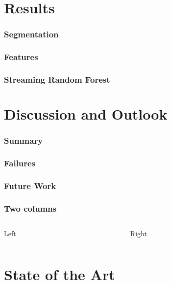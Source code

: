 \documentclass[mathserif]{beamer}
\begin{document}
\section{Results}
\begin{frame}
\frametitle{Segmentation}

\end{frame}

\begin{frame}
\frametitle{Features}

\end{frame}

\begin{frame}
\frametitle{Streaming Random Forest}

\end{frame}


\section{Discussion and Outlook}
\begin{frame}
\frametitle{Summary}

\end{frame}

\begin{frame}
\frametitle{Failures}

\end{frame}

\begin{frame}
\frametitle{Future Work}

\end{frame}



\begin{frame}
\frametitle{Two columns}
\begin{columns}[t]
\begin{column}{0.45\linewidth}
Left
\end{column}
\begin{column}{0.45\linewidth}
Right
\end{column}
\end{columns}
\end{frame}


\section{State of the Art}
\end{document}
